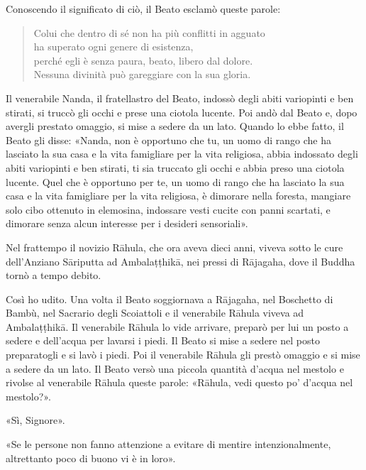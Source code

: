 Conoscendo il significato di ciò, il Beato esclamò queste parole:

\begin{quote}
Colui che dentro di sé non ha più conflitti in agguato \\
ha superato ogni genere di esistenza, \\
perché egli è senza paura, beato, libero dal dolore. \\
Nessuna divinità può gareggiare con la sua gloria.
\end{quote}


 Il venerabile Nanda, il fratellastro del Beato, indossò
degli abiti variopinti e ben stirati, si truccò gli occhi e prese una ciotola
lucente. Poi andò dal Beato e, dopo avergli prestato omaggio, si mise a sedere
da un lato. Quando lo ebbe fatto, il Beato gli disse: «Nanda, non è opportuno
che tu, un uomo di rango che ha lasciato la sua casa e la vita famigliare per la
vita religiosa, abbia indossato degli abiti variopinti e ben stirati, ti sia
truccato gli occhi e abbia preso una ciotola lucente. Quel che è opportuno per
te, un uomo di rango che ha lasciato la sua casa e la vita famigliare per la
vita religiosa, è dimorare nella foresta, mangiare solo cibo ottenuto in
elemosina, indossare vesti cucite con panni scartati, e dimorare senza alcun
interesse per i desideri sensoriali».


 Nel frattempo il novizio Rāhula, che ora aveva
dieci anni, viveva sotto le cure dell’Anziano Sāriputta ad Ambalaṭṭhikā, nei
pressi di Rājagaha, dove il Buddha tornò a tempo debito.

 Così ho udito. Una volta il Beato soggiornava a Rājagaha,
nel Boschetto di Bambù, nel Sacrario degli Scoiattoli e il venerabile Rāhula
viveva ad Ambalaṭṭhikā. Il venerabile Rāhula lo vide arrivare, preparò per lui
un posto a sedere e dell’acqua per lavarsi i piedi. Il Beato si mise a sedere
nel posto preparatogli e si lavò i piedi. Poi il venerabile Rāhula gli prestò
omaggio e si mise a sedere da un lato. Il Beato versò una piccola quantità
d’acqua nel mestolo e rivolse al venerabile Rāhula queste parole: «Rāhula, vedi
questo po’ d’acqua nel mestolo?».

«Sì, Signore».

«Se le persone non fanno attenzione a evitare di mentire intenzionalmente,
altrettanto poco di buono vi è in loro».

